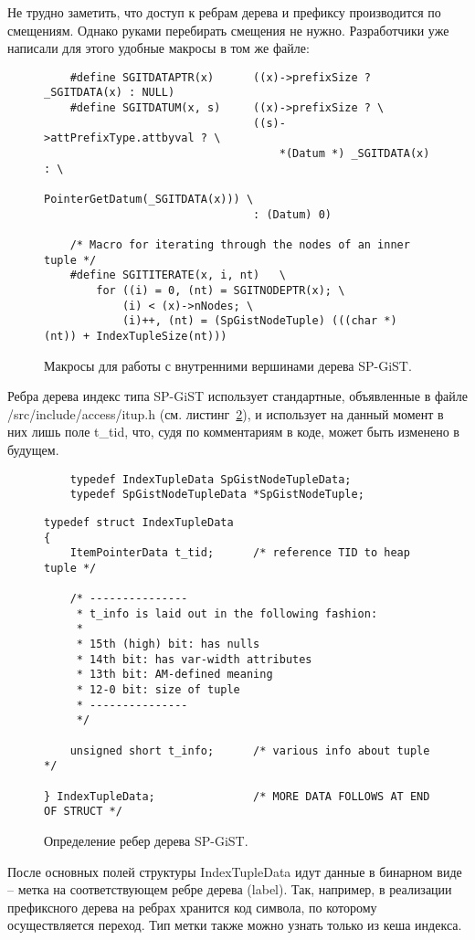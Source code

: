 \documentclass[12pt,oneside]{amsart}
\begin{document}
Не трудно заметить, что доступ к ребрам дерева и префиксу производится по смещениям. Однако руками перебирать смещения не нужно. Разработчики уже написали для этого удобные макросы в том же файле:

\begin{figure}[ht]
\begin{lstlisting}
	#define SGITDATAPTR(x)		((x)->prefixSize ? _SGITDATA(x) : NULL)
	#define SGITDATUM(x, s)		((x)->prefixSize ? \
								((s)->attPrefixType.attbyval ? \
									*(Datum *) _SGITDATA(x) : \
									PointerGetDatum(_SGITDATA(x))) \
								: (Datum) 0)

	/* Macro for iterating through the nodes of an inner tuple */
	#define SGITITERATE(x, i, nt)	\
		for ((i) = 0, (nt) = SGITNODEPTR(x); \
			(i) < (x)->nNodes; \
			(i)++, (nt) = (SpGistNodeTuple) (((char *) (nt)) + IndexTupleSize(nt)))
\end{lstlisting}
\caption{Макросы для работы с внутренними вершинами дерева SP-GiST.}\label{spInnerMacros}
\end{figure}

Ребра дерева индекс типа SP-GiST использует стандартные, объявленные в файле /src/include/access/itup.h (см. листинг~\ref{spGistEdge}), и использует на данный момент в них лишь поле t\_tid, что, судя по комментариям в коде, может быть изменено в будущем.
\begin{figure}[ht]
\begin{lstlisting}
	typedef IndexTupleData SpGistNodeTupleData;
	typedef SpGistNodeTupleData *SpGistNodeTuple;
\end{lstlisting}
\begin{lstlisting}
typedef struct IndexTupleData
{
	ItemPointerData t_tid;		/* reference TID to heap tuple */

	/* ---------------
	 * t_info is laid out in the following fashion:
	 *
	 * 15th (high) bit: has nulls
	 * 14th bit: has var-width attributes
	 * 13th bit: AM-defined meaning
	 * 12-0 bit: size of tuple
	 * ---------------
	 */

	unsigned short t_info;		/* various info about tuple */

} IndexTupleData;				/* MORE DATA FOLLOWS AT END OF STRUCT */
\end{lstlisting}
\caption{Определение ребер дерева SP-GiST.}\label{spGistEdge}
\end{figure}


После основных полей структуры IndexTupleData идут данные в бинарном виде -- метка на соответствующем ребре дерева (label). Так, например, в реализации префиксного дерева на ребрах хранится код символа, по которому осуществляется переход. Тип метки также можно узнать только из кеша индекса.
\end{document}
